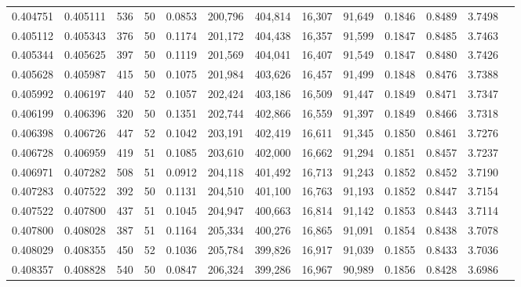 \begin{tabular}{rrrrrrrrrrrrr}
0.404751 & 0.405111 &   536 &  50 &                                     0.0853 & 200,796 & 404,814 &  16,307 &  91,649 & 0.1846 & 0.8489 & 3.7498 \\
0.405112 & 0.405343 &   376 &  50 &                                     0.1174 & 201,172 & 404,438 &  16,357 &  91,599 & 0.1847 & 0.8485 & 3.7463 \\
0.405344 & 0.405625 &   397 &  50 &                                     0.1119 & 201,569 & 404,041 &  16,407 &  91,549 & 0.1847 & 0.8480 & 3.7426 \\
0.405628 & 0.405987 &   415 &  50 &                                     0.1075 & 201,984 & 403,626 &  16,457 &  91,499 & 0.1848 & 0.8476 & 3.7388 \\
0.405992 & 0.406197 &   440 &  52 &                                     0.1057 & 202,424 & 403,186 &  16,509 &  91,447 & 0.1849 & 0.8471 & 3.7347 \\
0.406199 & 0.406396 &   320 &  50 &                                     0.1351 & 202,744 & 402,866 &  16,559 &  91,397 & 0.1849 & 0.8466 & 3.7318 \\
0.406398 & 0.406726 &   447 &  52 &                                     0.1042 & 203,191 & 402,419 &  16,611 &  91,345 & 0.1850 & 0.8461 & 3.7276 \\
0.406728 & 0.406959 &   419 &  51 &                                     0.1085 & 203,610 & 402,000 &  16,662 &  91,294 & 0.1851 & 0.8457 & 3.7237 \\
0.406971 & 0.407282 &   508 &  51 &                                     0.0912 & 204,118 & 401,492 &  16,713 &  91,243 & 0.1852 & 0.8452 & 3.7190 \\
0.407283 & 0.407522 &   392 &  50 &                                     0.1131 & 204,510 & 401,100 &  16,763 &  91,193 & 0.1852 & 0.8447 & 3.7154 \\
0.407522 & 0.407800 &   437 &  51 &                                     0.1045 & 204,947 & 400,663 &  16,814 &  91,142 & 0.1853 & 0.8443 & 3.7114 \\
0.407800 & 0.408028 &   387 &  51 &                                     0.1164 & 205,334 & 400,276 &  16,865 &  91,091 & 0.1854 & 0.8438 & 3.7078 \\
0.408029 & 0.408355 &   450 &  52 &                                     0.1036 & 205,784 & 399,826 &  16,917 &  91,039 & 0.1855 & 0.8433 & 3.7036 \\
0.408357 & 0.408828 &   540 &  50 &                                     0.0847 & 206,324 & 399,286 &  16,967 &  90,989 & 0.1856 & 0.8428 & 3.6986 \\

\end{tabular}
